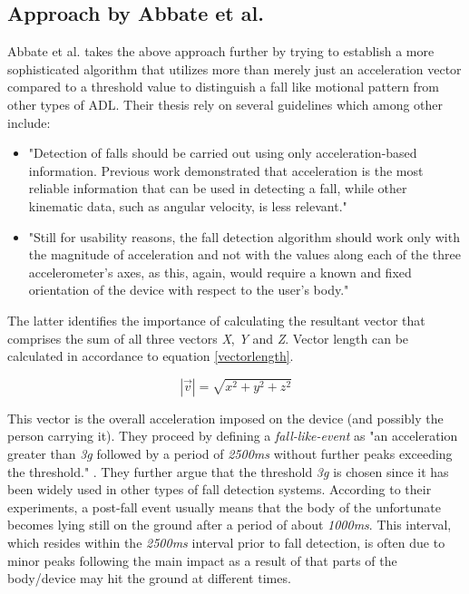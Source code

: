\documentclass[12pt, a4paper, onecolumn]{article}
\begin{document}
	\subsection{Approach by Abbate et al.}
	Abbate et al. takes the above approach further by trying to establish a more sophisticated algorithm that utilizes more than merely just an acceleration vector compared to a threshold value to distinguish a fall like motional pattern from other types of ADL. Their thesis rely on several guidelines which among other include: 
	\begin{itemize} 
		\item "Detection of falls should be carried out using only acceleration-based information. Previous work demonstrated that acceleration is the most reliable information that can be used in detecting a fall, while other kinematic data, such as angular velocity, is less relevant." \cite[p~3]{piza_uni}
		
		\item "Still for usability reasons, the fall detection algorithm should work only with the magnitude of acceleration and not with the values along each of the three accelerometer’s axes, as this, again, would require a known and fixed orientation of the device with respect to the user’s body." \cite[p~3]{piza_uni}
	\end{itemize}
	
	The latter identifies the importance of calculating the resultant vector that comprises the sum of all three vectors \textit{X}, \textit{Y} and \textit{Z}. Vector length can be calculated in accordance to equation \ref{vectorlength}.
	
	\begin{equation}
	\label{vectorlength}
	|\vec{v}|=\sqrt{x^2+y^2+z^2}
	\end{equation}
	
	This vector is the overall acceleration imposed on the device (and possibly the person carrying it). They proceed by defining a \textit{fall-like-event} as "an acceleration greater than \textit{3g} followed by a period of \textit{2500ms} without further peaks exceeding the threshold." \cite[p~5]{piza_uni}. They further argue that the threshold \textit{3g} is chosen since it has been widely used in other types of fall detection systems. According to their experiments, a post-fall event usually means that the body of the unfortunate becomes lying still on the ground after a period of about \textit{1000ms}. This interval, which resides within the \textit{2500ms} interval prior to fall detection, is often due to minor peaks following the main impact as a result of that parts of the body/device may hit the ground at different times. 
	
\end{document}
